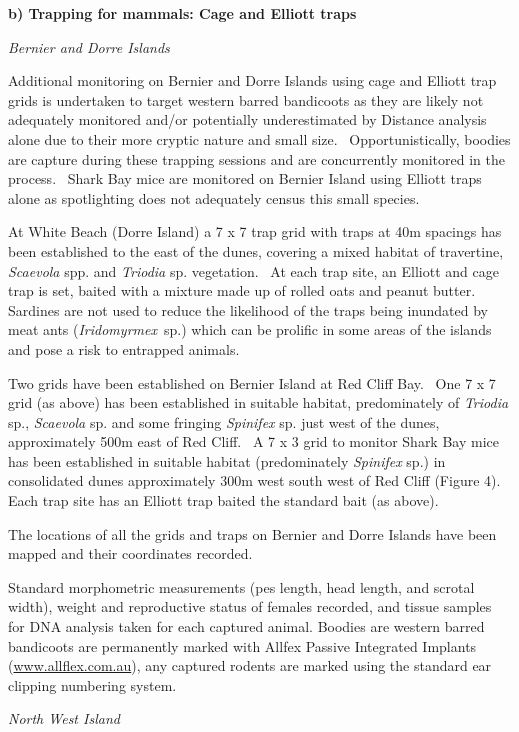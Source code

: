 \documentclass[version=last,
    paper=a4,                               %
    10pt,                                   %
    dvipsnames,
    oneside,                              %
    headings=openany,                       %
    open=any,
    BCOR=7mm,                               %
    DIV=15,     %
]{scrbook}
\begin{document}
\textbf{b) Trapping for mammals: Cage and Elliott traps}

\emph{Bernier and Dorre Islands}

Additional monitoring on Bernier and Dorre Islands using cage and
Elliott trap grids is undertaken to target western barred bandicoots as
they are likely not adequately monitored and/or potentially
underestimated by Distance analysis alone due to their more cryptic
nature and small size.~ Opportunistically, boodies are capture during
these trapping sessions and are concurrently monitored in the process.~
Shark Bay mice are monitored on Bernier Island using Elliott traps alone
as spotlighting does not adequately census this small species.

At White Beach (Dorre Island) a 7 x 7 trap grid with traps at 40m
spacings has been established to the east of the dunes, covering a mixed
habitat of travertine, \emph{Scaevola} spp. and \emph{Triodia} sp.
vegetation.~ At each trap site, an Elliott and cage trap is set, baited
with a mixture made up of rolled oats and peanut butter.~ Sardines are
not used to reduce the likelihood of the traps being inundated by meat
ants (\emph{Iridomyrmex}~sp.) which can be prolific in some areas of the
islands and pose a risk to entrapped animals.

Two grids have been established on Bernier Island at Red Cliff Bay.~ One
7 x 7 grid (as above) has been established in suitable habitat,
predominately of \emph{Triodia} sp., \emph{Scaevola} sp. and some
fringing \emph{Spinifex} sp. just west of the dunes, approximately 500m
east of Red Cliff.~ A 7 x 3 grid to monitor Shark Bay mice has been
established in suitable habitat (predominately \emph{Spinifex} sp.) in
consolidated dunes approximately 300m west south west of Red Cliff
(Figure 4).~ Each trap site has an Elliott trap baited the standard bait
(as above).

The locations of all the grids and traps on Bernier and Dorre Islands
have been mapped and their coordinates recorded.

Standard morphometric measurements (pes length, head length, and scrotal
width), weight and reproductive status of females recorded, and tissue
samples for DNA analysis taken for each captured animal. Boodies are
western barred bandicoots are permanently marked with Allfex Passive
Integrated Implants
(\href{http://www.allflex.com.au}{www.allflex.com.au}), any captured
rodents are marked using the standard ear clipping numbering system.

\emph{North West Island}
\end{document}

